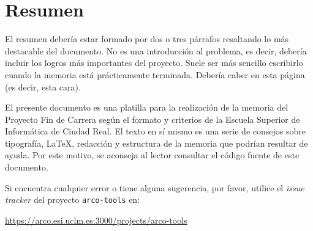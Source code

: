 
\chapter{Resumen}

El resumen debería estar formado por dos o tres párrafos resaltando lo más
destacable del documento. No es una introducción al problema, es decir, debería
incluir los logros más importantes del proyecto. Suele ser más sencillo
escribirlo cuando la memoria está prácticamente terminada. Debería caber en esta
página (es decir, esta cara).

El presente documento es una platilla para la realización de la memoria del
Proyecto Fin de Carrera según el formato y criterios de la Escuela Superior de
Informática de Ciudad Real. El texto en sí mismo es una serie de consejos sobre
tipografía, \LaTeX, redacción y estructura de la memoria que podrían resultar de
ayuda. Por este motivo, se aconseja al lector consultar el código fuente de
este documento.

Si encuentra cualquier error o tiene alguna sugerencia, por favor, utilice
el \emph{issue tracker} del proyecto \texttt{arco-tools} en:

\url{https://arco.esi.uclm.es:3000/projects/arco-tools}


